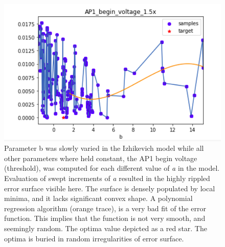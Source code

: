 

\begin{figure}
\centering
      \includegraphics[scale=0.85]{figures/parameter_b_hopeless_surface.png}
      \caption[Cross section of an objective function that harms efficient optimization]{Parameter b was slowly varied in the Izhikevich model while all other parameters where held constant, the AP1 begin voltage (threshold), was computed for each different value of \emph{a} in the model. Evaluation of swept increments of \emph{a} resulted in the highly rippled error surface visible here. The surface is densely populated by local minima, and it lacks significant convex shape. A polynomial regression algorithm (orange trace), is a very bad fit of the error function. This implies that the function is not very smooth, and seemingly random. The optima value depicted as a red star. The optima is buried in random irregularities of error surface.
    }
      \label{fig:probably_smooth_constraint}
\end{figure}

